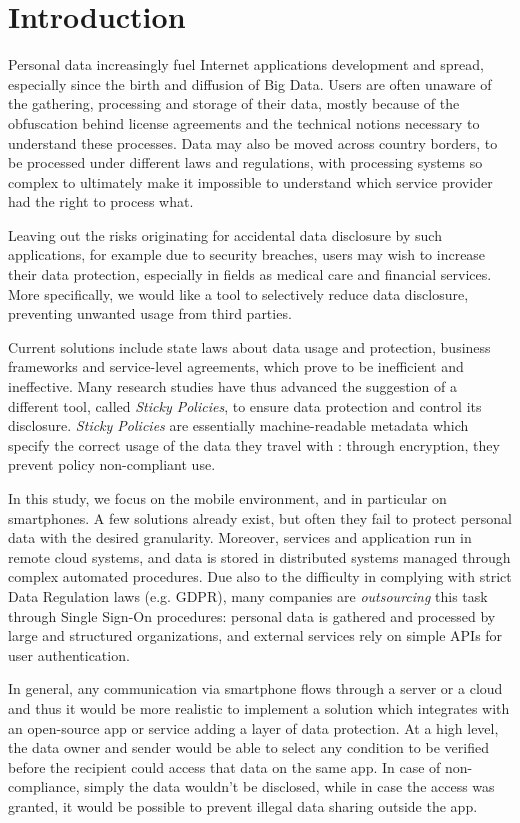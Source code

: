 \chapter{Introduction}
\label{Intro}
\thispagestyle{empty}

\noindent Personal data increasingly fuel Internet applications development and spread, especially since the birth and diffusion of Big Data. Users are often unaware of the gathering, processing and storage of their data, mostly because of the obfuscation behind license agreements and the technical notions necessary to understand these processes. Data may also be moved across country borders, to be processed under different laws and regulations, with processing systems so complex to ultimately make it impossible to understand which service provider had the right to process what.

Leaving out the risks originating for accidental data disclosure by such applications, for example due to security breaches, users may wish to increase their data protection, especially in fields as medical care and financial services. More specifically, we would like a tool to selectively reduce data disclosure, preventing unwanted usage from third parties.

Current solutions include state laws about data usage and protection, business frameworks and service-level agreements, which prove to be inefficient and ineffective. Many research studies have thus advanced the suggestion of a different tool, called \textit{Sticky Policies}, to ensure data protection and control its disclosure. \textit{Sticky Policies} are essentially machine-readable metadata which specify the correct usage of the data they travel with \cite{pearson2011sticky}: through encryption, they prevent policy non-compliant use.

In this study, we focus on the mobile environment, and in particular on smartphones. A few solutions already exist, but often they fail to protect personal data with the desired granularity. Moreover, services and application run in remote cloud systems, and data is stored in distributed systems managed through complex automated procedures. Due also to the difficulty in complying with strict Data Regulation laws (e.g. GDPR), many companies are \textit{outsourcing} this task through Single Sign-On procedures: personal data is gathered and processed by large and structured organizations, and external services rely on simple APIs for user authentication.

In general, any communication via smartphone flows through a server or a cloud and thus it would be more realistic to implement a solution which integrates with an open-source app or service adding a layer of data protection. At a high level, the data owner and sender would be able to select any condition to be verified before the recipient could access that data on the same app. In case of non-compliance, simply the data wouldn't be disclosed, while in case the access was granted, it would be possible to prevent illegal data sharing outside the app.

